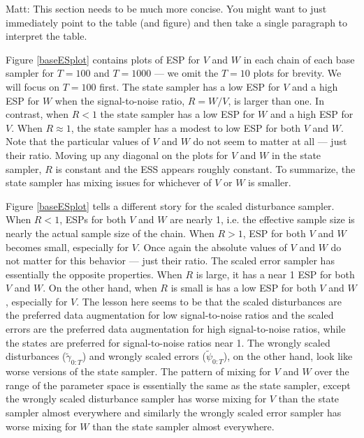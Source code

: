 \documentclass{article}
\newcommand{\matt}[1]{{\color{red} Matt: #1}}
\begin{document}
\matt{This section needs to be much more concise. You might want to just immediately point to the table (and figure) and then take a single paragraph to interpret the table.}

Figure \ref{baseESplot} contains plots of ESP for $V$ and $W$ in each chain of each base sampler for $T=100$ and $T=1000$ --- we omit the $T=10$ plots for brevity. We will focus on $T=100$ first. The state sampler has a low ESP for $V$ and a high ESP for $W$ when the signal-to-noise ratio, $R=W/V$, is larger than one. In contrast, when $R<1$ the state sampler has a low ESP for $W$ and a high ESP for $V$. When $R\approx 1$, the state sampler has a modest to low ESP for both $V$ and $W$. Note that the particular values of $V$ and $W$ do not seem to matter at all --- just their ratio. Moving up any diagonal on the plots for $V$ and $W$ in the state sampler, $R$ is constant and the ESS appears roughly constant. To summarize, the state sampler has mixing issues for whichever of $V$ or $W$ is smaller.

Figure \ref{baseESplot} tells a different story for the scaled disturbance sampler. When $R<1$, ESPs for both $V$ and $W$ are nearly 1, i.e. the effective sample size is nearly the actual sample size of the chain. When $R>1$, ESP for both $V$ and $W$ becomes small, especially for $V$. Once again the absolute values of $V$ and $W$ do not matter for this behavior --- just their ratio. The scaled error sampler has essentially the opposite properties. When $R$ is large, it has a near 1 ESP for both $V$ and $W$. On the other hand, when $R$ is small is has a low ESP for both $V$ and $W$, especially for $V$. The lesson here seems to be that the scaled disturbances are the preferred data augmentation for low signal-to-noise ratios and the scaled errors  are the preferred data augmentation for high signal-to-noise ratios, while the states are preferred for signal-to-noise ratios near 1. The wrongly scaled disturbances ($\tilde{\gamma}_{0:T}$) and wrongly scaled errors ($\tilde{\psi}_{0:T}$), on the other hand, look like worse versions of the state sampler. The pattern of mixing for $V$ and $W$ over the range of the parameter space is essentially the same as the state sampler, except the wrongly scaled disturbance sampler has worse mixing for $V$ than the state sampler almost everywhere and similarly the wrongly scaled error sampler has worse mixing for $W$ than the state sampler almost everywhere.
\end{document}
